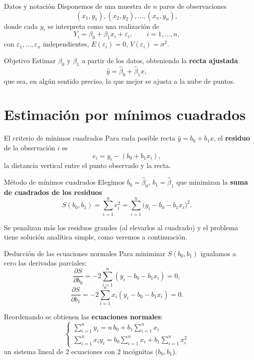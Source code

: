 \documentclass[aspectratio=169,11pt]{beamer}
\begin{document}
\begin{frame}{Datos y notación}
Disponemos de una muestra de $n$ pares de observaciones
\[
(x_1,y_1), (x_2,y_2), \dots, (x_n,y_n),
\]
donde cada $y_i$ se interpreta como una realización de
\[
Y_i = \beta_0 + \beta_1 x_i + \varepsilon_i, \qquad i=1,\dots,n,
\]
con $\varepsilon_1,\dots,\varepsilon_n$ independientes, $E(\varepsilon_i)=0$, $V(\varepsilon_i)=\sigma^2$.

\begin{block}{Objetivo}
Estimar $\beta_0$ y $\beta_1$ a partir de los datos, obteniendo la \textbf{recta ajustada}
\[
\hat y = \hat\beta_0 + \hat\beta_1 x,
\]
que sea, en algún sentido preciso, la que mejor se ajusta a la nube de puntos.
\end{block}
\end{frame}

\section{Estimación por mínimos cuadrados}

\begin{frame}{El criterio de mínimos cuadrados}
Para cada posible recta $\hat y = b_0 + b_1 x$, el \textbf{residuo} de la observación $i$ es
\[
e_i = y_i - (b_0 + b_1 x_i),
\]
la distancia vertical entre el punto observado y la recta.

\begin{block}{Método de mínimos cuadrados}
Elegimos $b_0=\hat\beta_0$, $b_1=\hat\beta_1$ que minimizan la \textbf{suma de cuadrados de los residuos}
\[
S(b_0,b_1) = \sum_{i=1}^n e_i^2 = \sum_{i=1}^n \big(y_i - b_0 - b_1 x_i\big)^2.
\]
\end{block}

Se penalizan más los residuos grandes (al elevarlos al cuadrado) y el problema tiene solución analítica simple, como veremos a continuación.
\end{frame}

\begin{frame}{Deducción de las ecuaciones normales}
Para minimizar $S(b_0,b_1)$ igualamos a cero las derivadas parciales:
\[
\frac{\partial S}{\partial b_0} = -2\sum_{i=1}^n (y_i - b_0 - b_1 x_i) = 0,
\]
\[
\frac{\partial S}{\partial b_1} = -2\sum_{i=1}^n x_i(y_i - b_0 - b_1 x_i) = 0.
\]

Reordenando se obtienen las \textbf{ecuaciones normales}:
\[
\begin{cases}
\displaystyle \sum_{i=1}^n y_i = n\, b_0 + b_1 \sum_{i=1}^n x_i \\[4pt]
\displaystyle \sum_{i=1}^n x_i y_i = b_0 \sum_{i=1}^n x_i + b_1 \sum_{i=1}^n x_i^2
\end{cases}
\]
un sistema lineal de 2 ecuaciones con 2 incógnitas ($b_0,b_1$).
\end{frame}
\end{document}
